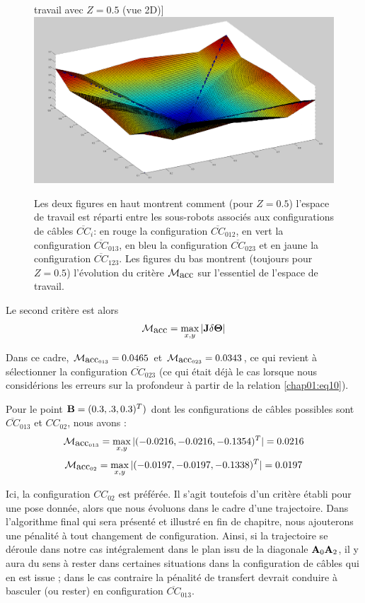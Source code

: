 \begin{figure}[!htp]
travail avec $Z = 0.5$ (vue 2D)]{\label{chap01:fig5view3}
    \includegraphics[width=.45\linewidth]{./chapter01/figures/crit_acc03.png}}
    \caption{\footnotesize Les deux figures en haut montrent comment (pour 
$Z = 0.5$) l'espace de travail est r\'eparti entre les sous-robots associ\'es 
aux configurations de c\^ables $\overline{CC}_i$: en rouge la configuration 
$\overline{CC}_{012}$, en vert la configuration $\overline{CC}_{013}$, en bleu 
la configuration $\overline{CC}_{023}$ et en jaune la configuration 
$\overline{CC}_{123}$. Les figures du bas montrent (toujours pour $Z = 0.5$) 
l'\'evolution du crit\`ere $\mathcal M_{\hbox{acc}}$ sur l'essentiel de 
l'espace de travail.}
\label{chap01:fig5}
\end{figure}

Le second crit\`ere est alors
\begin{equation}
\mathcal M_{\hbox{acc}} = \max_{x,y} |{\bf J} \delta {\bf \Theta}|
\label{chap01:eq11}
\end{equation}

Dans ce cadre, $\mathcal M_{\hbox{acc}_{013}} = 0.0465$ et 
$\mathcal M_{\hbox{acc}_{023}} = 0.0343$, ce qui revient \`a s\'electionner la 
configuration $\overline{CC}_{023}$ (ce qui \'etait d\'ej\`a le cas lorsque 
nous consid\'erions les erreurs sur la profondeur \`a partir de la relation 
\ref{chap01:eq10}).

Pour le point ${\bf B} = (0.3,.3,0.3)^T)$ dont les configurations de c\^ables 
possibles sont $\overline{CC}_{013}$ et $CC_{02}$, nous avons :
$$\mathcal M_{\hbox{acc}_{013}} = \max_{x,y} |(-0.0216,-0.0216,-0.1354)^T| = 
0.0216$$ 
$$\mathcal M_{\hbox{acc}_{02}} = \max_{x,y} |( -0.0197, -0.0197, -0.1338)^T| 
= 0.0197$$

Ici, la configuration $CC_{02}$ est pr\'ef\'er\'ee. Il s'agit toutefois d'un 
crit\`ere \'etabli pour une pose donn\'ee, alors que nous \'evoluons dans le 
cadre d'une trajectoire. Dans l'algorithme final qui sera pr\'esent\'e et 
illustr\'e en fin de chapitre, nous ajouterons une p\'enalit\'e \`a tout 
changement de configuration. Ainsi, si la trajectoire se d\'eroule dans notre 
cas int\'egralement dans le plan issu de la diagonale ${\bf A}_0{\bf A}_2$, il 
y aura du sens \`a rester dans certaines situations dans la configuration de 
c\^ables qui en est issue ; dans le cas contraire la p\'enalit\'e de transfert 
devrait conduire \`a basculer (ou rester) en configuration 
$\overline{CC}_{013}$.

